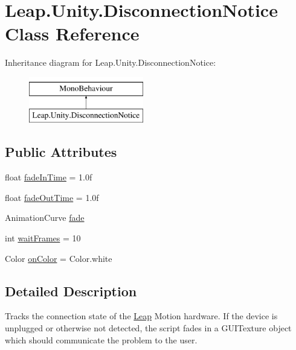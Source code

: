 \hypertarget{class_leap_1_1_unity_1_1_disconnection_notice}{}\section{Leap.\+Unity.\+Disconnection\+Notice Class Reference}
\label{class_leap_1_1_unity_1_1_disconnection_notice}
Inheritance diagram for Leap.\+Unity.\+Disconnection\+Notice\+:\begin{figure}[H]
\begin{center}
\leavevmode
\includegraphics[height=2.000000cm]{class_leap_1_1_unity_1_1_disconnection_notice}
\end{center}
\end{figure}
\subsection*{Public Attributes}
\begin{DoxyCompactItemize}
\item 
float \mbox{\hyperlink{class_leap_1_1_unity_1_1_disconnection_notice_a5236c20bc41466e9b41791b3ef5c19d6}{fade\+In\+Time}} = 1.\+0f
\item 
float \mbox{\hyperlink{class_leap_1_1_unity_1_1_disconnection_notice_ab0d46e8e760f64e5d576bb5d17647d9c}{fade\+Out\+Time}} = 1.\+0f
\item 
Animation\+Curve \mbox{\hyperlink{class_leap_1_1_unity_1_1_disconnection_notice_a790ba197bec4ec0a035f01505d3b5cc1}{fade}}
\item 
int \mbox{\hyperlink{class_leap_1_1_unity_1_1_disconnection_notice_a31b87b2e3c6dde73afd348419356e8d4}{wait\+Frames}} = 10
\item 
Color \mbox{\hyperlink{class_leap_1_1_unity_1_1_disconnection_notice_ab781e52e1da2bc11e38831950e74a619}{on\+Color}} = Color.\+white
\end{DoxyCompactItemize}


\subsection{Detailed Description}
Tracks the connection state of the \mbox{\hyperlink{namespace_leap_1_1_unity_1_1_leap}{Leap}} Motion hardware. If the device is unplugged or otherwise not detected, the script fades in a G\+U\+I\+Texture object which should communicate the problem to the user.

